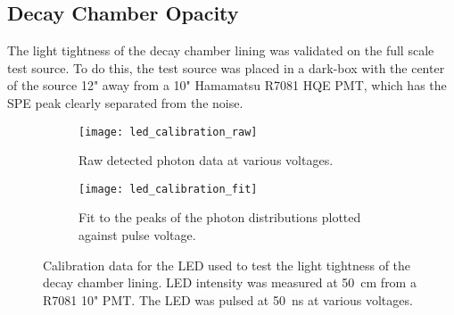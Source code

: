 \subsection{Decay Chamber Opacity}
\label{sec:liningtest}
The light tightness of the decay chamber lining was validated on the full scale test source. 
To do this, the test source was placed in a dark-box with the center of the source 12" away from a 10" Hamamatsu R7081 HQE PMT, which has the SPE peak clearly separated from the noise. 
\begin{figure}
\begin{subfigure}{0.49\textwidth}
\texttt{[image: led\_calibration\_raw]}
\caption{Raw detected photon data at various voltages.}
\label{fig:ledRAW}
\end{subfigure}
\hspace{0.2cm}
\begin{subfigure}{0.49\textwidth}
\texttt{[image: led\_calibration\_fit]}
\caption{Fit to the peaks of the photon distributions plotted against pulse voltage.}
\label{fig:ledFit}
\end{subfigure}
\caption{Calibration data for the LED used to test the light tightness of the decay chamber lining. LED intensity was measured at 50~cm from a R7081 10" PMT. The LED was pulsed at 50~ns at various voltages.}
\label{fig:calibratedled1}
\end{figure}

